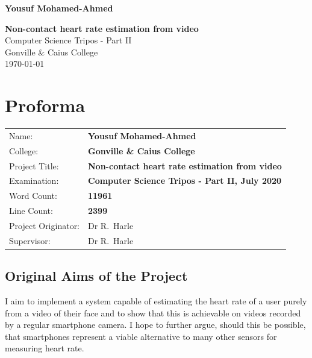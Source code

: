 \documentclass[12pt,twoside,notitlepage]{report}
\begin{document}





\pagestyle{empty}

\hfill{\LARGE \bf Yousuf Mohamed-Ahmed}

\vspace*{60mm}
\begin{center}
\Huge
{\bf Non-contact heart rate estimation from video} \\
\vspace*{5mm}
Computer Science Tripos - Part II  \\
\vspace*{5mm}
Gonville \& Caius College\\
\vspace*{5mm}
\today  %
\end{center}

\cleardoublepage


\setcounter{page}{1}
\pagestyle{plain}

\chapter*{Proforma}

{\large
\begin{tabular}{ll}
Name:               & \bf Yousuf Mohamed-Ahmed \\
College:            & \bf Gonville \& Caius College                     \\
Project Title:      & \bf Non-contact heart rate estimation from video \\
Examination:        & \bf Computer Science Tripos - Part II, July 2020    \\
Word Count:         & \bf 11961\footnotemark[1] \\
Line Count: & \bf 2399 \\
Project Originator: & Dr R.~Harle                    \\
Supervisor:         & Dr R.~Harle                    \\ 
\end{tabular}
}


\section*{Original Aims of the Project}
 I aim to implement a system capable of estimating the heart rate of a user purely from a video of their face and to show that this is achievable
on videos recorded by a regular smartphone camera. I hope to further argue, should this be possible, that smartphones represent a viable 
alternative to many other sensors for measuring heart rate.
\end{document}
